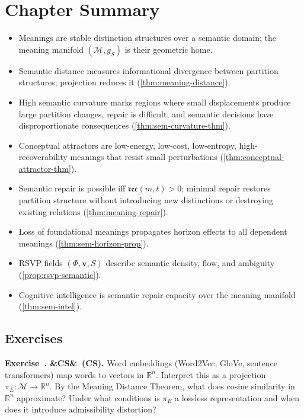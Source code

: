\documentclass[12pt,twoside,openright]{book}
\newcommand{\reco}{\mathfrak{rec}}
\newenvironment{chapsummary}{%
  \begin{tcolorbox}[colback=DistBlue!5,colframe=DistBlue,
    title={\faBookOpen\enspace Summary},
    fonttitle=\sffamily\bfseries\color{white},
    attach boxed title to top left={yshift=-2mm,xshift=4mm},
    boxed title style={colback=DistBlue,rounded corners}]
  \begin{itemize}[nosep,leftmargin=*]}{%
  \end{itemize}\end{tcolorbox}}
\newcounter{exercise}[chapter]
\newenvironment{exercise}[1][]{%
  \refstepcounter{exercise}%
  \noindent\textbf{\sffamily\color{DistBlue}%
  Exercise~\thechapter.\theexercise%
  \ifx&#1&\else~(#1)\fi.}\enspace}{\par\medskip}
\begin{document}
\section*{Chapter Summary}
\begin{chapsummary}
  \item Meanings are stable distinction structures over
        a semantic domain; the meaning manifold
        $(\mathcal{M}, g_S)$ is their geometric home.
  \item Semantic distance measures informational
        divergence between partition structures;
        projection reduces it
        (\cref{thm:meaning-distance}).
  \item High semantic curvature marks regions where
        small displacements produce large partition
        changes, repair is difficult, and semantic
        decisions have disproportionate consequences
        (\cref{thm:sem-curvature-thm}).
  \item Conceptual attractors are low-energy, low-cost,
        low-entropy, high-recoverability meanings that
        resist small perturbations
        (\cref{thm:conceptual-attractor-thm}).
  \item Semantic repair is possible iff
        $\reco(m,t) > 0$; minimal repair
        restores partition structure without introducing
        new distinctions or destroying existing relations
        (\cref{thm:meaning-repair}).
  \item Loss of foundational meanings propagates
        horizon effects to all dependent meanings
        (\cref{thm:sem-horizon-prop}).
  \item RSVP fields $(\Phi, \mathbf{v}, S)$ describe
        semantic density, flow, and ambiguity
        (\cref{prop:rsvp-semantic}).
  \item Cognitive intelligence is semantic repair
        capacity over the meaning manifold
        (\cref{thm:sem-intel}).
\end{chapsummary}

\subsection*{Exercises}

\begin{exercise}[CS]
  Word embeddings (Word2Vec, GloVe, sentence
  transformers) map words to vectors in $\mathbb{R}^n$.
  Interpret this as a projection
  $\pi_E : \mathcal{M} \to \mathbb{R}^n$.
  By the Meaning Distance Theorem, what does cosine
  similarity in $\mathbb{R}^n$ approximate?
  Under what conditions is $\pi_E$ a lossless
  representation and when does it introduce admissibility
  distortion?
\end{exercise}
\end{document}
